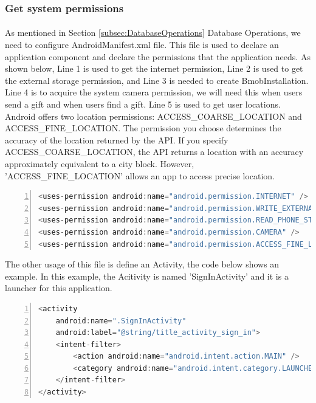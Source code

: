 \subsubsection{Get system permissions}
\label{subsubsec:GetSystemPermissions}
\paragraph{} As mentioned in Section \ref{subsec:DatabaseOperations} Database Operations, we need to configure AndroidManifest.xml file. This file is used to declare an application component and declare the permissions that the application needs. As shown below, Line 1 is used to get the internet permission, Line 2 is used to get the external storage permission, and Line 3 is needed to create BmobInstallation. Line 4 is to acquire the system camera permission, we will need this when users send a gift and when users find a gift. Line 5 is used to get user locations. Android offers two location permissions: ACCESS\_COARSE\_LOCATION and ACCESS\_FINE\_LOCATION. The permission you choose determines the accuracy of the location returned by the API. If you specify ACCESS\_COARSE\_LOCATION, the API returns a location with an accuracy approximately equivalent to a city block. However, 'ACCESS\_FINE\_LOCATION' allows an app to access precise location.
\begin{lstlisting}[language={java},
        numbers=left,basicstyle=\small\ttfamily,breaklines=true] 
<uses-permission android:name="android.permission.INTERNET" />
<uses-permission android:name="android.permission.WRITE_EXTERNAL_STORAGE" />
<uses-permission android:name="android.permission.READ_PHONE_STATE" />
<uses-permission android:name="android.permission.CAMERA" />
<uses-permission android:name="android.permission.ACCESS_FINE_LOCATION" />
\end{lstlisting} 
\par The other usage of this file is define an Activity, the code below shows an example. In this example, the Acitivity is named 'SignInActivity' and it is a launcher for this application.
\begin{lstlisting}[language={java},
        numbers=left,basicstyle=\small\ttfamily,breaklines=true] 
<activity
    android:name=".SignInActivity"
    android:label="@string/title_activity_sign_in">
    <intent-filter>
        <action android:name="android.intent.action.MAIN" />
        <category android:name="android.intent.category.LAUNCHER" />
    </intent-filter>
</activity>
\end{lstlisting} 

